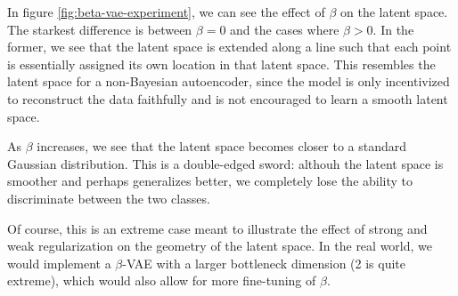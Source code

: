 In figure \ref{fig:beta-vae-experiment}, we can see the effect of $\beta$ on the latent space. The starkest difference is between $\beta=0$ and the cases where $\beta > 0$. In the former, we see that the latent space is extended along a line such that each point is essentially assigned its own location in that latent space. This resembles the latent space for a non-Bayesian autoencoder, since the model is only incentivized to reconstruct the data faithfully and is not encouraged to learn a smooth latent space.

As $\beta$ increases, we see that the latent space becomes closer to a standard Gaussian distribution. This is a double-edged sword: althouh the latent space is smoother and perhaps generalizes better, we completely lose the ability to discriminate between the two classes.

Of course, this is an extreme case meant to illustrate the effect of strong and weak regularization on the geometry of the latent space. In the real world, we would implement a $\beta$-VAE with a larger bottleneck dimension (2 is quite extreme), which would also allow for more fine-tuning of $\beta$.